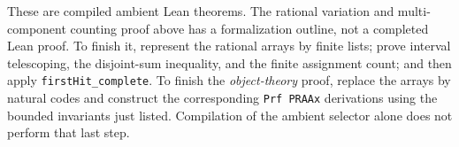 These are compiled ambient Lean theorems. The rational variation and
multi-component counting proof above has a formalization outline, not a
completed Lean proof. To finish it, represent the rational arrays by
finite lists; prove interval telescoping, the disjoint-sum inequality,
and the finite assignment count; and then apply
\texttt{firstHit\_complete}. To finish the \emph{object-theory} proof,
replace the arrays by natural codes and construct the corresponding
\texttt{Prf PRAAx} derivations using the bounded invariants just listed.
Compilation of the ambient selector alone does not perform that last
step.
